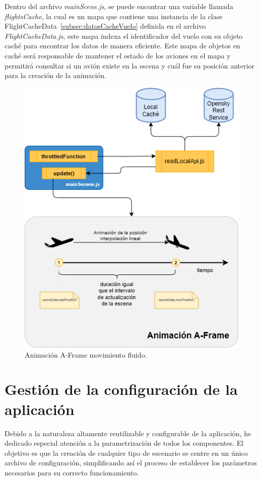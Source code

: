 \documentclass[a4paper, 11pt]{book}
\begin{document}
Dentro del archivo \emph{mainScene.js}, se puede encontrar una variable llamada \emph{flightsCache}, la cual es un mapa que contiene una instancia de la clase FlightCacheData~\ref{subsec:datosCacheVuelo} definida en el archivo \emph{FlightCacheData.js}, este mapa indexa el identificador del vuelo con su objeto caché para encontrar los datos de manera eficiente. Este mapa de objetos en caché será responsable de mantener el estado de los aviones en el mapa y permitirá consultar si un avión existe en la escena y cuál fue su posición anterior para la creación de la animación.
\begin{figure}[h]
	\centering
	\includegraphics[width=12cm, keepaspectratio]{img/movimientoFluido.drawio.png}
	\caption{Animación A-Frame movimiento fluido.}
	\label{fig:movimientoFluido}
\end{figure}


\clearpage
\section{Gestión de la configuración de la aplicación}
\label{sec:configuration}
Debido a la naturaleza altamente reutilizable y configurable de la aplicación, he dedicado especial atención a la parametrización de todos los componentes. El objetivo es que la creación de cualquier tipo de escenario se centre en un único archivo de configuración, simplificando así el proceso de establecer los parámetros necesarios para su correcto funcionamiento.
\end{document}

